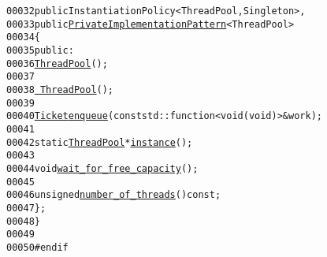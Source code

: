 \begin{footnotesize}
\begin{alltt}
00032         \textcolor{keyword}{public} InstantiationPolicy<ThreadPool, Singleton>,
00033         \textcolor{keyword}{public} \hyperlink{classeos_1_1PrivateImplementationPattern}{PrivateImplementationPattern}<ThreadPool>
00034     \{
00035         \textcolor{keyword}{public}:
00036             \hyperlink{classeos_1_1ThreadPool_a0ecd93cf3757d0e087023d42ee30d984}{ThreadPool}();
00037 
00038             \hyperlink{classeos_1_1ThreadPool_af8929a7e28f8e3d7539a10c026c2588d}{~ThreadPool}();
00039 
00040             \hyperlink{classeos_1_1Ticket}{Ticket} \hyperlink{classeos_1_1ThreadPool_aa53eba2596379e9a258930324817a0df}{enqueue}(\textcolor{keyword}{const} std::function<\textcolor{keywordtype}{void} (\textcolor{keywordtype}{void})> & work);
00041 
00042             \textcolor{keyword}{static} \hyperlink{classeos_1_1ThreadPool}{ThreadPool} * \hyperlink{classeos_1_1ThreadPool_afcdf38abab1caae94bc6e90b5b5d69bf}{instance}();
00043 
00044             \textcolor{keywordtype}{void} \hyperlink{classeos_1_1ThreadPool_ae5dee2f59b31e15db165313a32c89885}{wait_for_free_capacity}();
00045 
00046             \textcolor{keywordtype}{unsigned} \hyperlink{classeos_1_1ThreadPool_ad077ff091504b8e6d73fca55ef41baae}{number_of_threads}() \textcolor{keyword}{const};
00047     \};
00048 \}
00049 
00050 \textcolor{preprocessor}{#endif}
\end{alltt}\end{footnotesize}
